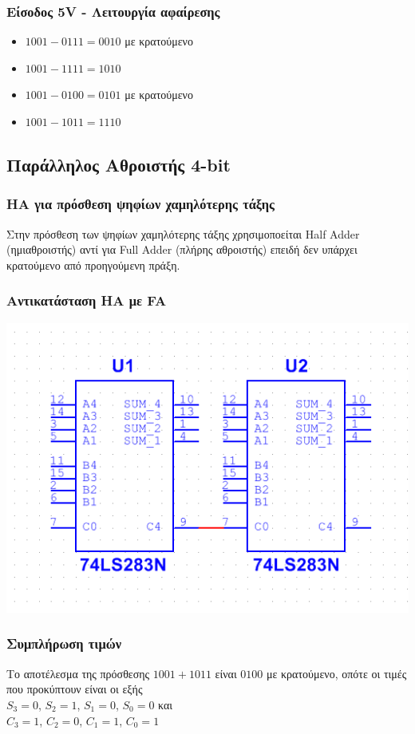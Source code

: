 \documentclass{article}
\begin{document}
\subsubsection{Είσοδος 5V - Λειτουργία αφαίρεσης}
\begin{itemize}
    \item $1001 - 0111 = 0010$ με κρατούμενο
    \item $1001 - 1111 = 1010$
    \item $1001 - 0100 = 0101$ με κρατούμενο
    \item $1001 - 1011 = 1110$
\end{itemize}

\subsection{Παράλληλος Αθροιστής 4-bit}
\subsubsection{HA για πρόσθεση ψηφίων χαμηλότερης τάξης}
Στην πρόσθεση των ψηφίων χαμηλότερης τάξης χρησιμοποείται Half Adder (ημιαθροιστής)
αντί για Full Adder (πλήρης αθροιστής) επειδή δεν υπάρχει κρατούμενο από προηγούμενη
πράξη.

\subsubsection{Αντικατάσταση HA με FA}
\includegraphics[width=\textwidth]{./res/8bitfa.png}

\subsubsection{Συμπλήρωση τιμών}
Το αποτέλεσμα της πρόσθεσης $1001 + 1011$ είναι $0100$ με κρατούμενο,
οπότε οι τιμές που προκύπτουν είναι οι εξής \\
$S_3 = 0$, $S_2 = 1$, $S_1 = 0$, $S_0 = 0$ και \\
$C_3 = 1$, $C_2 = 0$, $C_1 = 1$, $C_0 = 1$
\end{document}
